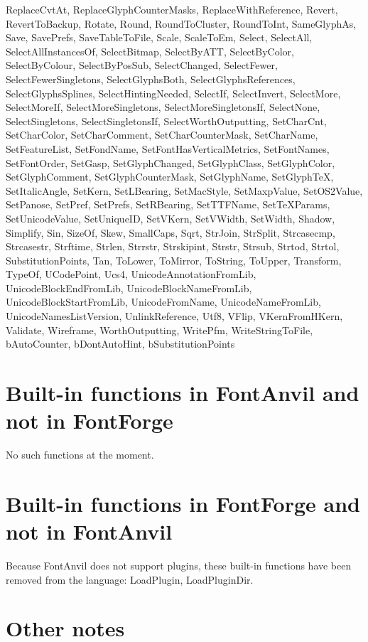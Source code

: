 \documentclass[11pt]{report}
\begin{document}
ReplaceCvtAt,
ReplaceGlyphCounterMasks,
ReplaceWithReference,
Revert,
RevertToBackup,
Rotate,
Round,
RoundToCluster,
RoundToInt,
SameGlyphAs,
Save,
SavePrefs,
SaveTableToFile,
Scale,
ScaleToEm,
Select,
SelectAll,
SelectAllInstancesOf,
SelectBitmap,
SelectByATT,
SelectByColor,
SelectByColour,
SelectByPosSub,
SelectChanged,
SelectFewer,
SelectFewerSingletons,
SelectGlyphsBoth,
SelectGlyphsReferences,
SelectGlyphsSplines,
SelectHintingNeeded,
SelectIf,
SelectInvert,
SelectMore,
SelectMoreIf,
SelectMoreSingletons,
SelectMoreSingletonsIf,
SelectNone,
SelectSingletons,
SelectSingletonsIf,
SelectWorthOutputting,
SetCharCnt,
SetCharColor,
SetCharComment,
SetCharCounterMask,
SetCharName,
SetFeatureList,
SetFondName,
SetFontHasVerticalMetrics,
SetFontNames,
SetFontOrder,
SetGasp,
SetGlyphChanged,
SetGlyphClass,
SetGlyphColor,
SetGlyphComment,
SetGlyphCounterMask,
SetGlyphName,
SetGlyphTeX,
SetItalicAngle,
SetKern,
SetLBearing,
SetMacStyle,
SetMaxpValue,
SetOS2Value,
SetPanose,
SetPref,
SetPrefs,
SetRBearing,
SetTTFName,
SetTeXParams,
SetUnicodeValue,
SetUniqueID,
SetVKern,
SetVWidth,
SetWidth,
Shadow,
Simplify,
Sin,
SizeOf,
Skew,
SmallCaps,
Sqrt,
StrJoin,
StrSplit,
Strcasecmp,
Strcasestr,
Strftime,
Strlen,
Strrstr,
Strskipint,
Strstr,
Strsub,
Strtod,
Strtol,
SubstitutionPoints,
Tan,
ToLower,
ToMirror,
ToString,
ToUpper,
Transform,
TypeOf,
UCodePoint,
Ucs4,
UnicodeAnnotationFromLib,
UnicodeBlockEndFromLib,
UnicodeBlockNameFromLib,
UnicodeBlockStartFromLib,
UnicodeFromName,
UnicodeNameFromLib,
UnicodeNamesListVersion,
UnlinkReference,
Utf8,
VFlip,
VKernFromHKern,
Validate,
Wireframe,
WorthOutputting,
WritePfm,
WriteStringToFile,
bAutoCounter,
bDontAutoHint,
bSubstitutionPoints

\section{Built-in functions in FontAnvil and not in FontForge }

No such functions at the moment.

\section{Built-in functions in FontForge and not in FontAnvil }

Because FontAnvil does not support plugins, these built-in functions have
been removed from the language:  LoadPlugin, LoadPluginDir.

\section{Other notes}
\end{document}
